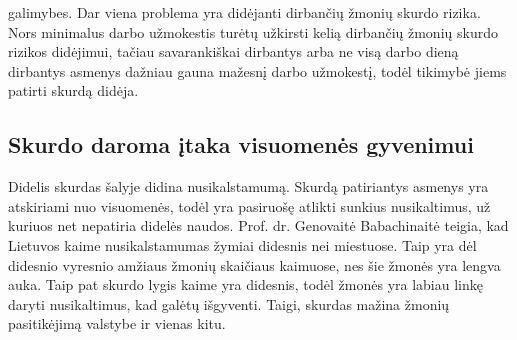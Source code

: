 \documentclass[12pt,titlepage]{article}
\begin{document}
galimybes.\parencite{vsileika2006skurdas} Dar viena problema yra didėjanti dirbančių žmonių skurdo rizika. Nors minimalus darbo užmokestis turėtų užkirsti kelią dirbančių žmonių skurdo rizikos didėjimui, tačiau savarankiškai dirbantys arba ne visą darbo dieną dirbantys asmenys dažniau gauna mažesnį darbo užmokestį, todėl tikimybė jiems patirti skurdą didėja.


\subsection{Skurdo daroma įtaka visuomenės gyvenimui}
\justify
\hspace{\parindent}
Didelis skurdas šalyje didina nusikalstamumą. Skurdą patiriantys asmenys yra atskiriami nuo visuomenės, todėl yra pasiruošę atlikti sunkius nusikaltimus, už kuriuos net nepatiria didelės naudos. Prof. dr. Genovaitė Babachinaitė teigia, kad Lietuvos kaime nusikalstamumas žymiai didesnis nei miestuose. Taip yra dėl didesnio vyresnio amžiaus žmonių skaičiaus kaimuose, nes šie žmonės yra lengva auka. Taip pat skurdo lygis kaime yra didesnis, todėl žmonės yra labiau linkę daryti nusikaltimus, kad galėtų išgyventi. Taigi, skurdas mažina žmonių pasitikėjimą valstybe ir vienas kitu.
\justify
\end{document}
